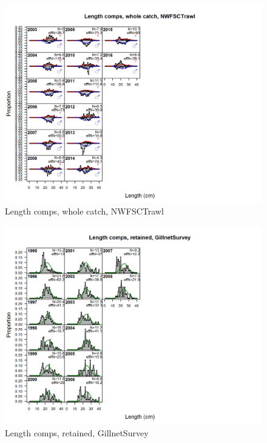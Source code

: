 \documentclass[12pt,]{article}
\begin{document}
\begin{figure}[htbp]
\centering
\includegraphics{./r4ss/plots_mod1/comp_lenfit_flt8mkt0.png}
\caption{Length comps, whole catch, NWFSCTrawl
\label{fig:mod1_10_comp_lenfit_flt8mkt0}}
\end{figure}

\begin{figure}[htbp]
\centering
\includegraphics{./r4ss/plots_mod1/comp_lenfit_flt9mkt2.png}
\caption{Length comps, retained, GillnetSurvey
\label{fig:mod1_11_comp_lenfit_flt9mkt2}}
\end{figure}
\end{document}
